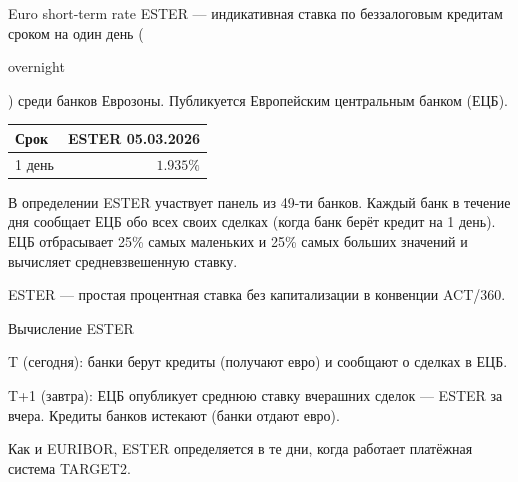 \documentclass{beamer}
\newcommand{\en}[1]{\begin{otherlanguage}{english}#1\end{otherlanguage}}
\begin{document}
\begin{frame}{Euro short-term rate}
\justify
\alert{ESTER} --- индикативная ставка по беззалоговым кредитам сроком на один день (\en{overnight}) среди банков Еврозоны. Публикуется Европейским центральным банком (ЕЦБ).

\justify
\centering
\begin{tabular}{l|r}
Срок   & ESTER 05.03.2026 \\ \hline
1 день & $1.935\%$
\end{tabular}

\justify
В определении ESTER участвует панель из 49-ти банков. Каждый банк в течение дня сообщает ЕЦБ обо всех своих сделках (когда банк берёт кредит на 1 день). ЕЦБ отбрасывает 25\% самых маленьких и 25\% самых больших значений и вычисляет средневзвешенную ставку.

\justify
ESTER --- простая процентная ставка без капитализации в конвенции ACT/360.
\end{frame}



\begin{frame}{Вычисление ESTER}
\justify
\centering
{}

\justify
T (сегодня): банки берут кредиты (получают евро) и сообщают о сделках в ЕЦБ.

T+1 (завтра): ЕЦБ опубликует среднюю ставку вчерашних сделок --- ESTER за вчера. Кредиты банков истекают (банки отдают евро).

\justify
Как и EURIBOR, ESTER определяется в те дни, когда работает платёжная система TARGET2.
\end{frame}



\newcommand{\plotBenchmarkRate}[2] {
	
	\addplot[
		color = #2,
		mark = none,
		thick
	]
	table[
		x=date,
		y=#1,
		col sep=comma
	]
	{euro_benchmark.csv};
}
\end{document}
